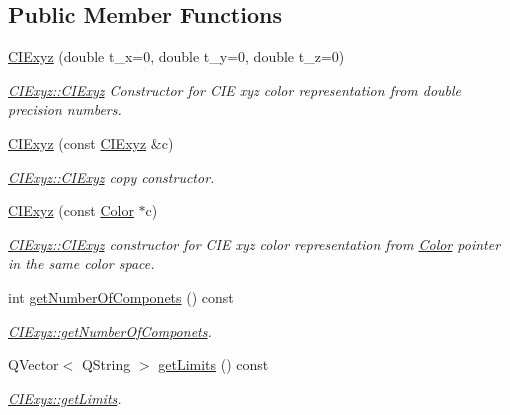\subsection*{Public Member Functions}
\begin{DoxyCompactItemize}
\item 
\hyperlink{class_c_i_exyz_aea8a8b567ac89a96b0bf4c749a49ea90}{C\+I\+Exyz} (double t\+\_\+x=0, double t\+\_\+y=0, double t\+\_\+z=0)
\begin{DoxyCompactList}\small\item\em \hyperlink{class_c_i_exyz_aea8a8b567ac89a96b0bf4c749a49ea90}{C\+I\+Exyz\+::\+C\+I\+Exyz} Constructor for C\+IE xyz color representation from double precision numbers. \end{DoxyCompactList}\item 
\hyperlink{class_c_i_exyz_aa16b12dfc4f0ceac557778e5bede454c}{C\+I\+Exyz} (const \hyperlink{class_c_i_exyz}{C\+I\+Exyz} \&c)
\begin{DoxyCompactList}\small\item\em \hyperlink{class_c_i_exyz_aea8a8b567ac89a96b0bf4c749a49ea90}{C\+I\+Exyz\+::\+C\+I\+Exyz} copy constructor. \end{DoxyCompactList}\item 
\hyperlink{class_c_i_exyz_a861692ec98ae70d205cbee47fc63a879}{C\+I\+Exyz} (const \hyperlink{class_color}{Color} $\ast$c)
\begin{DoxyCompactList}\small\item\em \hyperlink{class_c_i_exyz_aea8a8b567ac89a96b0bf4c749a49ea90}{C\+I\+Exyz\+::\+C\+I\+Exyz} constructor for C\+IE xyz color representation from \hyperlink{class_color}{Color} pointer in the same color space. \end{DoxyCompactList}\item 
int \hyperlink{class_c_i_exyz_af168733bb1bca36a7ae5d75c67de046e}{get\+Number\+Of\+Componets} () const
\begin{DoxyCompactList}\small\item\em \hyperlink{class_c_i_exyz_af168733bb1bca36a7ae5d75c67de046e}{C\+I\+Exyz\+::get\+Number\+Of\+Componets}. \end{DoxyCompactList}\item 
Q\+Vector$<$ Q\+String $>$ \hyperlink{class_c_i_exyz_a4c3aa6777f7720ae26b53174322a83f8}{get\+Limits} () const
\begin{DoxyCompactList}\small\item\em \hyperlink{class_c_i_exyz_a4c3aa6777f7720ae26b53174322a83f8}{C\+I\+Exyz\+::get\+Limits}. \end{DoxyCompactList}\item 

\end{DoxyCompactItemize}
